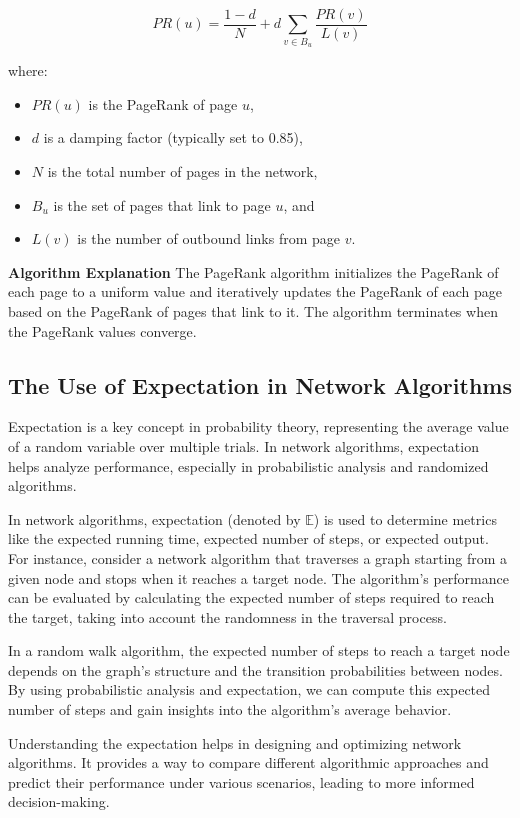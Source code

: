 \documentclass[12pt]{book} %
\begin{document}
\[
PR(u) = \frac{1 - d}{N} + d \sum_{v \in B_u} \frac{PR(v)}{L(v)}
\]

where:
\begin{itemize}
    \item \(PR(u)\) is the PageRank of page \(u\),
    \item \(d\) is a damping factor (typically set to 0.85),
    \item \(N\) is the total number of pages in the network,
    \item \(B_u\) is the set of pages that link to page \(u\), and
    \item \(L(v)\) is the number of outbound links from page \(v\).
\end{itemize}

\textbf{Algorithm Explanation}
The PageRank algorithm initializes the PageRank of each page to a uniform value and iteratively updates the PageRank of each page based on the PageRank of pages that link to it. The algorithm terminates when the PageRank values converge.

\subsection{The Use of Expectation in Network Algorithms}
Expectation is a key concept in probability theory, representing the average value of a random variable over multiple trials. In network algorithms, expectation helps analyze performance, especially in probabilistic analysis and randomized algorithms.

In network algorithms, expectation (denoted by \(\mathbb{E}\)) is used to determine metrics like the expected running time, expected number of steps, or expected output. For instance, consider a network algorithm that traverses a graph starting from a given node and stops when it reaches a target node. The algorithm's performance can be evaluated by calculating the expected number of steps required to reach the target, taking into account the randomness in the traversal process.

In a random walk algorithm, the expected number of steps to reach a target node depends on the graph's structure and the transition probabilities between nodes. By using probabilistic analysis and expectation, we can compute this expected number of steps and gain insights into the algorithm's average behavior.

Understanding the expectation helps in designing and optimizing network algorithms. It provides a way to compare different algorithmic approaches and predict their performance under various scenarios, leading to more informed decision-making.
\end{document}
